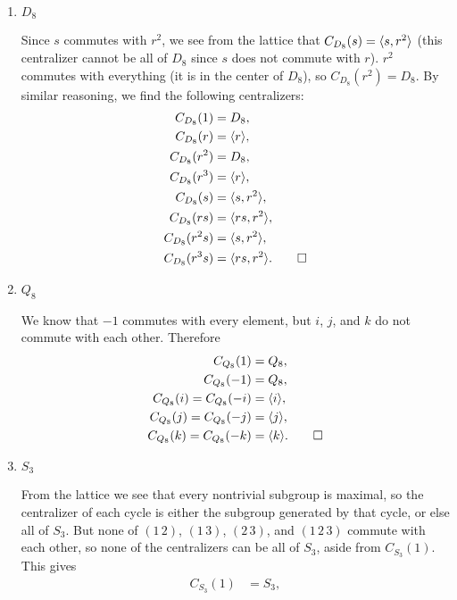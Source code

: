 \begin{enumerate}
\item $D_8$
  \begin{solution}
    Since $s$ commutes with $r^2$, we see from the lattice that
    $C_{D_8}(s) = \langle{s, r^2}\rangle$ (this centralizer cannot be all of
    $D_8$ since $s$ does not commute with $r$). $r^2$ commutes with
    everything (it is in the center of $D_8$), so
    $C_{D_8}(r^2) = D_8$. By similar reasoning, we find the following
    centralizers:
    \begin{align*}
      C_{D_8}(1) &= D_8, \\
      C_{D_8}(r) &= \langle{r}\rangle, \\
      C_{D_8}(r^2) &= D_8, \\
      C_{D_8}(r^3) &= \langle{r}\rangle, \\
      C_{D_8}(s) &= \langle{s, r^2}\rangle, \\
      C_{D_8}(rs) &= \langle{rs,r^2}\rangle, \\
      C_{D_8}(r^2s) &= \langle{s, r^2}\rangle, \\
      C_{D_8}(r^3s) &= \langle{rs, r^2}\rangle. \qedhere
    \end{align*}
  \end{solution}
\item $Q_8$
  \begin{solution}
    We know that $-1$ commutes with every element, but $i$, $j$, and
    $k$ do not commute with each other. Therefore
    \begin{align*}
      C_{Q_8}(1) &= Q_8, \\
      C_{Q_8}(-1) &= Q_8, \\
      C_{Q_8}(i) = C_{Q_8}(-i) &= \langle{i}\rangle, \\
      C_{Q_8}(j) = C_{Q_8}(-j) &= \langle{j}\rangle, \\
      C_{Q_8}(k) = C_{Q_8}(-k) &= \langle{k}\rangle. \qedhere
    \end{align*}
  \end{solution}
\item $S_3$
  \begin{solution}
    From the lattice we see that every nontrivial subgroup is maximal,
    so the centralizer of each cycle is either the subgroup generated
    by that cycle, or else all of $S_3$. But none of $(1\,2)$,
    $(1\,3)$, $(2\,3)$, and $(1\,2\,3)$ commute with each other, so
    none of the centralizers can be all of $S_3$, aside from
    $C_{S_3}(1)$. This gives
    \begin{align*}
      C_{S_3}(1) &= S_3, \\

\end{align*}
\end{solution}
\end{enumerate}
